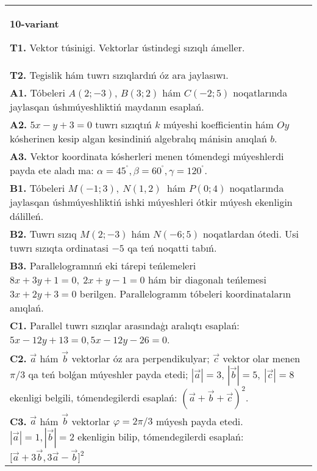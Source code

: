 \documentclass{article}
\begin{document}
\begin{tabular}{m{17cm}}
\textbf{10-variant}

\textbf{T1.} 
Vektor túsinigi. Vektorlar ústindegi sızıqlı ámeller.
 \\
\textbf{T2.} 
Tegislik hám tuwrı sızıqlardıń óz ara jaylasıwı.
 \\
\textbf{A1.} 
Tóbeleri $A (2;-3) $, $B (3;2) $ hám $C (-2;5) $
noqatlarında jaylasqan úshmúyeshliktiń maydanın esaplań.
 \\
\textbf{A2.} 
$5x-y+3=0$ tuwrı sızıqtıń $k$ múyeshi
koefficientin hám $Oy$ kósherinen kesip algan kesindiniń algebralıq
mánisin anıqlań $b$.
 \\
\textbf{A3.} 
Vektor koordinata kósherleri menen tómendegi múyeshlerdi payda ete aladı ma:
$\alpha = 45^{{^\circ}},\beta = 60^{{^\circ}},\gamma = 120^{{^\circ}}$.
 \\
\textbf{B1.} 
Tóbeleri \(M (-1;3),\ N (1,2) \ \) hám \(P (0;4) \)
noqatlarında jaylasqan úshmúyeshliktiń ishki múyeshleri ótkir múyesh
ekenligin dálilleń.
 \\
\textbf{B2.} 
Tuwrı sızıq \(M (2;-3) \) hám \(N (-6;5) \) noqatlardan ótedi.
Usi tuwrı sızıqta ordinatasi $-5$ qa teń noqatti tabıń.
 \\
\textbf{B3.} 
Parallelogramnıń eki tárepi teńlemeleri
\(8x+3y+1=0,\ 2x+y-1=0\) hám bir diagonalı teńlemesi
\(3x+2y+3=0\) berilgen. Parallelogramm tóbeleri koordinataların
anıqlań.
 \\
\textbf{C1.} 
Parallel tuwrı sızıqlar arasındaģı aralıqtı esaplań: $5x-12y+13=0, 5x-12y-26=0$.
 \\
\textbf{C2.} 
$\vec{a}$ hám $\vec{b}$ vektorlar óz ara perpendikulyar; $\vec{c}$ vektor olar menen $\pi/3$ qa teń bolǵan múyeshler payda etedi; $|\vec{a}| = 3$, $|\vec{b}| = 5,\ |\vec{c}| = 8$ ekenligi belgili, tómendegilerdi esaplań:
$ (\vec{a} + \vec{b} + \vec{c}) ^{2}$.
 \\
\textbf{C3.} 
$\vec{a}$ hám $\vec{b}$ vektorlar $\varphi = 2\pi/3$ múyesh payda etedi. $|\vec{a}| = 1,|\vec{b}| = 2$ ekenligin bilip, tómendegilerdi esaplań:
$\lbrack\overrightarrow{a} + 3\overrightarrow{b},3\overrightarrow{a} - \overrightarrow{b}\rbrack^{2}$
 \\

\end{tabular}
\vspace{1cm}
\end{document}
